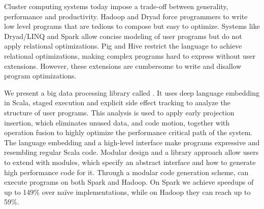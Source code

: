 Cluster computing systems today impose a trade-off between generality, performance and productivity. Hadoop and Dryad force programmers to write low level programs that are tedious to compose but easy to optimize. Systems like Dryad/LINQ and Spark allow concise modeling of user programs but do not apply relational optimizations. Pig and Hive restrict the language to achieve relational optimizations, making complex programs hard to express without user extensions. However, these extensions are cumbersome to write and disallow program optimizations.

We present a big data processing library called \tool. It uses deep language embedding in Scala, staged execution and explicit side effect tracking to analyze the structure of user programs. This analysis is used to apply early projection insertion, which eliminates unused data, and code motion, together with operation fusion to highly optimize the performance critical path of the system. The language embedding and a high-level interface make \tool programs expressive and resembling regular Scala code. Modular design and a library approach allow users to extend \tool with modules, which specify an abstract interface and how to generate high performance code for it. Through a modular code generation scheme, \tool can execute programs on both Spark and Hadoop. On Spark we achieve speedups of up to 149\% over naïve implementations, while on Hadoop they can reach up to 59\%.